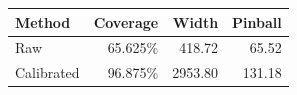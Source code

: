 \begin{tabular}{lrrr}
\toprule
Method & Coverage & Width & Pinball \\
\midrule
Raw & 65.625\% & 418.72 & 65.52 \\
Calibrated & 96.875\% & 2953.80 & 131.18 \\
\bottomrule
\end{tabular}
